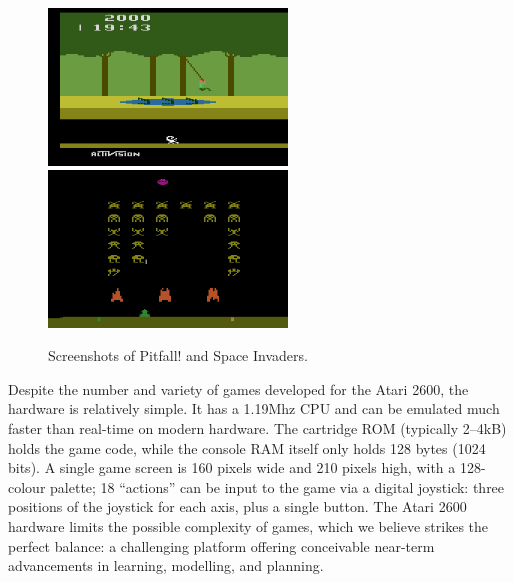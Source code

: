 \documentclass[twoside,11pt]{article}
\newcommand{\gamename}[1]{{\sc #1}}
\begin{document}
\begin{figure}[t!]
\begin{center}
\includegraphics[width=2.5in]{images/pitfall_screen.png}
\includegraphics[width=2.5in]{images/space_invaders_screen.png}
\caption{Screenshots of \gamename{Pitfall!} and \gamename{Space Invaders}.\label{fig:atari_domain:screenshots}}
\end{center}
\vspace{-1.5em}
\end{figure}

Despite the number and variety of games developed for the Atari 2600, the hardware is relatively simple.  It has a 1.19Mhz CPU and can be emulated much faster than real-time on modern hardware.  The cartridge ROM (typically 2--4kB) holds the game code, while the console RAM itself only holds 128 bytes (1024 bits). A single game screen is 160 pixels wide and 210 pixels high, with a 128-colour palette; 18 ``actions'' can be input to the game via a digital joystick: three positions of the joystick for each axis, plus a single button.  The Atari 2600 hardware limits the possible complexity of games, which we believe strikes the perfect balance: a challenging platform offering conceivable near-term advancements in learning, modelling, and planning.
\end{document}
